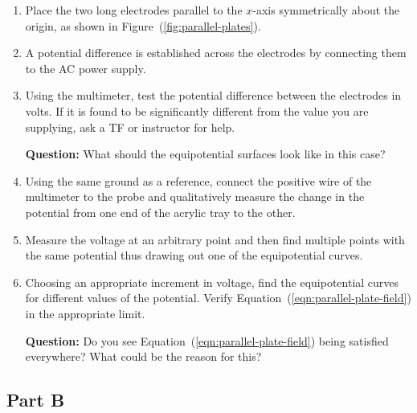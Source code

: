 \begin{enumerate}
    \item Place the two long electrodes parallel to the $x$-axis symmetrically about the origin, as shown in Figure~(\ref{fig:parallel-plates}).
    
    \item A potential difference is established across the electrodes by connecting them to the AC power supply.
    
    \item Using the multimeter, test the potential difference between the electrodes in volts. If it is found to be significantly different from the value you are supplying, ask a TF or instructor for help. 
    
    \begin{question}
        \textbf{Question:} What should the equipotential surfaces look like in this case?
    \end{question}
    
    \item Using the same ground as a reference, connect the positive wire of the multimeter to the probe and qualitatively measure the change in the potential from one end of the acrylic tray to the other.
    
    \item Measure the voltage at an arbitrary point and then find multiple points with the same potential thus drawing out one of the equipotential curves. 
    
    \item Choosing an appropriate increment in voltage, find the equipotential curves for different values of the potential. Verify Equation~(\ref{eqn:parallel-plate-field}) in the appropriate limit. 
    
    \begin{question}
        \textbf{Question:} Do you see Equation~(\ref{eqn:parallel-plate-field}) being satisfied everywhere? What could be the reason for this?
    \end{question}


\end{enumerate}


\subsection*{Part B}

